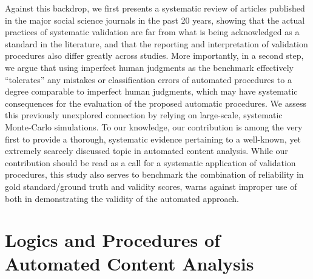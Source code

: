 \documentclass[man, floatsintext, 12pt, a4paper, noextraspace]{apa6}
\begin{document}
    Against this backdrop, we first presents a systematic review of articles published in the major social science journals in the past 20 years, showing that the actual practices of systematic validation are far from what is being acknowledged as a standard in the literature, and that the reporting and interpretation of validation procedures also differ greatly across studies. More importantly, in a second step, we argue that using imperfect human judgments as the benchmark effectively \enquote{tolerates} any mistakes or classification errors of automated procedures to a degree comparable to imperfect human judgments, which may have systematic consequences for the evaluation of the proposed automatic procedures. We assess this previously unexplored connection by relying on large-scale, systematic Monte-Carlo simulations. To our knowledge, our contribution is among the very first to provide a thorough, systematic evidence pertaining to a well-known, yet extremely scarcely discussed topic in automated content analysis. While our contribution should be read as a call for a systematic application of validation procedures, this study also serves to benchmark the combination of reliability in gold standard/ground truth and validity scores, warns against improper use of both in demonstrating the validity of the automated approach. 
    
 \section{Logics and Procedures of Automated Content Analysis}
 
\end{document}
